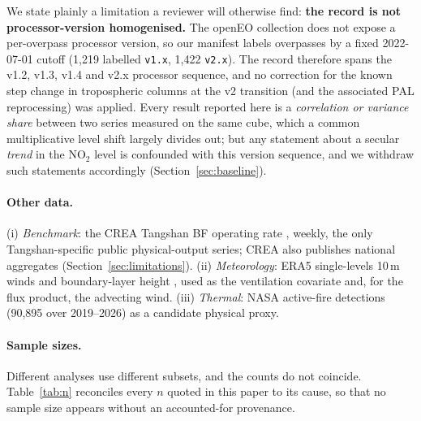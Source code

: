 \documentclass[11pt,a4paper]{article}
\providecommand{\ce}[1]{\ensuremath{\mathrm{#1}}}
\begin{document}
We state plainly a limitation a reviewer will otherwise find: \textbf{the record is not
processor-version homogenised.} The openEO collection does not expose a per-overpass processor
version, so our manifest labels overpasses by a fixed 2022-07-01 cutoff
(1{,}219 labelled \texttt{v1.x}, 1{,}422 \texttt{v2.x}). The record therefore spans the
v1.2, v1.3, v1.4 and v2.x processor sequence, and no correction for the known
step change in tropospheric columns at the v2 transition (and the associated PAL reprocessing)
was applied. Every result reported here is a \emph{correlation or variance share} between two
series measured on the same cube, which a common multiplicative level shift largely divides out;
but any statement about a secular \emph{trend} in the \ce{NO_2} level is confounded with this
version sequence, and we withdraw such statements accordingly (Section~\ref{sec:baseline}).

\paragraph{Other data.} (i) \emph{Benchmark}: the CREA Tangshan BF operating rate
\citep{crea_steel_benchmark}, weekly, the only Tangshan-specific public physical-output series;
CREA also publishes national aggregates (Section~\ref{sec:limitations}). (ii)
\emph{Meteorology}: ERA5 single-levels 10\,m winds and boundary-layer height
\citep{hersbach_2020_era5,cds_era5}, used as the ventilation covariate and, for the flux product,
the advecting wind. (iii) \emph{Thermal}: NASA active-fire detections (90{,}895 over 2019--2026)
as a candidate physical proxy.

\paragraph{Sample sizes.} Different analyses use different subsets, and the counts do not
coincide. Table~\ref{tab:n} reconciles every $n$ quoted in this paper to its cause, so that no
sample size appears without an accounted-for provenance.
\end{document}
